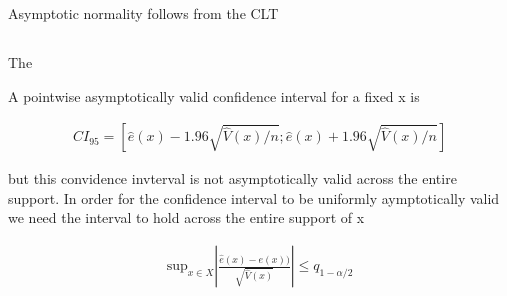 \documentclass[12pt]{article}
\begin{document}
Asymptotic normality follows from the CLT

\subsection{}

The

A pointwise asymptotically valid confidence interval for a fixed x is

\begin{gather*}
CI_{95} = \left[\hat{e}(x)  - 1.96  \sqrt{\hat{V}(x) / n}  ; \hat{e}(x)  + 1.96  \sqrt{\hat{V}(x) / n}  \right]
\end{gather*}

but this convidence invterval is not asymptotically valid across the entire support. In order for the confidence interval to be uniformly aymptotically valid we need the interval to hold across the entire support of x

\begin{gather*}
  \text{sup}_{x\in X} \left| \frac{\hat{e}(x) - e(x))}{\sqrt{\hat{V}(x)}} \right| \leq q_{1-\alpha/2}
\end{gather*}



\subsection{}
\subsubsection{}
\end{document}
